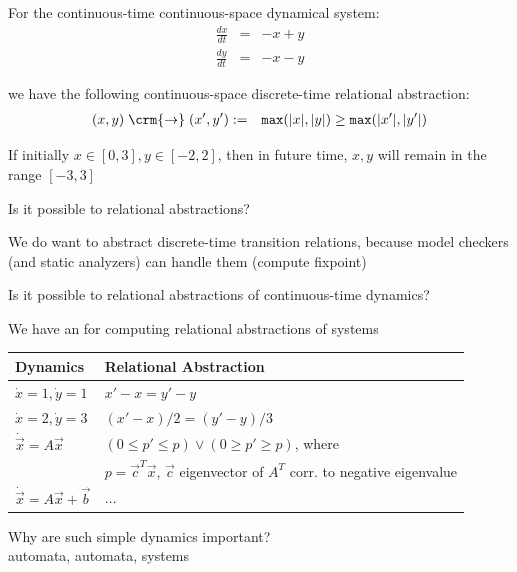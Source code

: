 \documentclass{seminar}
\begin{document}
\begin{slide}

For the continuous-time continuous-space dynamical system:
\begin{eqnarray*}
 \frac{dx}{dt} & = & -x + y
\\
 \frac{dy}{dt} & = & -x - y
\end{eqnarray*}

we have the following continuous-space discrete-time relational abstraction:
\begin{eqnarray*}
(x,y) \;{\crm{\rightarrow}}\; (x',y')  & := &
   \mathtt{max}(|x|,|y|) \geq 
   \mathtt{max}(|x'|,|y'|)
\end{eqnarray*}

If initially $x \in [0,3], y \in [-2,2]$, then in {} future time,
$x,y$ will remain in the range $[-3,3]$


\end{slide}
\begin{slide}

Is it possible to {} relational abstractions?

\bigskip

We do {} want to abstract discrete-time transition relations,
because model checkers (and static analyzers) can handle them (compute fixpoint)

\bigskip
Is it possible to {} relational abstractions of
continuous-time dynamics?

\end{slide}
\begin{slide}

We have an {} for computing relational abstractions
of {} systems

\bigskip

\begin{tabular}{|l|l|}
\hline
Dynamics & Relational Abstraction
\\
\hline \hline
$\dot{x} = 1, \dot{y} = 1$
&
$x'-x = y'-y$
\\
\hline
$\dot{x} = 2, \dot{y} = 3$
&
$(x'-x)/2 = (y'-y)/3$
\\
\hline
$\dot{\vec{x}} = A\vec{x}$
&
$(0 \leq p' \leq p) \vee (0 \geq p' \geq p)$, where
\\
&
$p = \vec{c}^T\vec{x}$, $\vec{c}$ eigenvector
of $A^T$ corr. to negative eigenvalue
\\
\hline
$\dot{\vec{x}} = A\vec{x} + \vec{b}$
& 
$\ldots$
\\
\hline
\end{tabular}

\medskip
Why are such simple dynamics important?
\\
{} automata, 
{} automata, {} systems

\end{slide}
\end{document}
